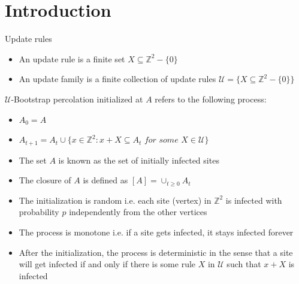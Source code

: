 \section{Introduction}
\begin{frame}{Update rules}
    
    \begin{itemize}
        \item An update rule is a finite set $X\subseteq\mathbb{Z}^2-\{0\}$
        \item An update family is a finite collection of update rules $\mathscr{U}=\{X\subseteq\mathbb{Z}^2-\{0\}\}$
    \end{itemize}
    
 
\begin{block}{}
   
 $\mathscr{U}$-Bootstrap percolation initialized at $A$ refers to the following process:

 \begin{itemize}
     \item $A_0=A$
     \item $A_{t+1}=A_t\cup \{x\in\mathbb{Z}^2: x+X\subseteq A_t \textit{ for some } X\in\mathscr{U}\}$
 \end{itemize}
 \end{block}
 
 \end{frame}
 \begin{frame}

 \begin{itemize}
 
 
     \item The set $A$ is known as the set of initially infected sites
     \item The closure of $A$ is defined as $[A]=\cup_{t\geq 0} A_t$
     \item The initialization is random i.e. each site (vertex)
     in $\mathbb{Z}^2$ is infected with probability $p$ independently from the other vertices
     \item The process is monotone i.e. if a site gets infected, it stays infected forever
     \item After the initialization, the process is deterministic in the sense that a site will get infected if and only if there is some rule $X$ in $\mathscr{U}$ such that $x+X$ is infected
 \end{itemize}
 


\end{frame}




